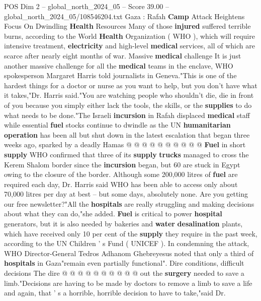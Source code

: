 \begin{textsample}{POS Dim 2 – global\_north\_2024\_05 – Score 39.00 – global\_north\_2024\_05/108546204.txt}  \label{ex:f2_pos_292}
Gaza : Rafah \textbf{Camp} Attack Heightens Focus On Dwindling \textbf{Health} Resources Many of those \textbf{injured} suffered terrible burns, according to the World \textbf{Health} Organization ( WHO ), which will require intensive treatment, \textbf{electricity} and high-level \textbf{medical} services, all of which are scarce after nearly eight months of war.
Massive \textbf{medical} challenge It is just another massive challenge for all the \textbf{medical} teams in the enclave, WHO spokesperson Margaret Harris told journalists in Geneva."This is one of the hardest things for a doctor or nurse as you want to help, but you don't have what it takes,"Dr.
Harris said."You are watching people who shouldn't die, die in front of you because you simply either lack the tools, the skills, or the \textbf{supplies} to do what needs to be done."The Israeli \textbf{incursion} in Rafah displaced \textbf{medical} staff while essential \textbf{fuel} stocks continue to dwindle as the UN \textbf{humanitarian} \textbf{operation} has been all but shut down in the latest escalation that began three weeks ago, sparked by a deadly Hamas @ @ @ @ @ @ @ @ @ @ \textbf{Fuel} in short \textbf{supply} WHO confirmed that three of its \textbf{supply} \textbf{trucks} managed to cross the Kerem Shalom border since the \textbf{incursion} began, but 60 are stuck in Egypt owing to the closure of the border.
Although some 200,000 litres of \textbf{fuel} are required each day, Dr.
Harris said WHO has been able to access only about 70,000 litres per day at best -- but some days, absolutely none.
Are you getting our free newsletter?"All the \textbf{hospitals} are really struggling and making decisions about what they can do,"she added. \textbf{Fuel} is critical to power \textbf{hospital} generators, but it is also needed by bakeries and \textbf{water} \textbf{desalination} plants, which have received only 10 per cent of the \textbf{supply} they require in the past week, according to the UN Children ' s Fund ( UNICEF ).
In condemning the attack, WHO Director-General Tedros Adhanom Ghebreyesus noted that only a third of \textbf{hospitals} in Gaza"remain even partially functional".
Dire conditions, difficult decisions The dire @ @ @ @ @ @ @ @ @ @ out the \textbf{surgery} needed to save a limb."Decisions are having to be made by doctors to remove a limb to save a life and again, that ' s a horrible, horrible decision to have to take,"said Dr.

\end{textsample}

